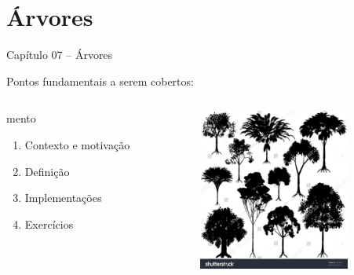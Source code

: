 \section{Árvores}

\begin{frame}

\begin{center}
{\Large Capítulo 07 -- Árvores}
\end{center}

Pontos fundamentais a serem cobertos:
\begin{columns}
\begin{column}{.3\textwidth}mento

\centering

  \begin{enumerate}
  \item Contexto e motivação

  \item Definição

  \item Implementações

  \item Exercícios 

\end{enumerate}  

\end{column}
\begin{column}{.7\textwidth}
\centering
\includegraphics[height=5.3cm, width=7cm]{figs/fig_arvores/arv_CAPA.jpg}
\hspace{+0.25cm}
\end{column}
\end{columns}


\end{frame}
